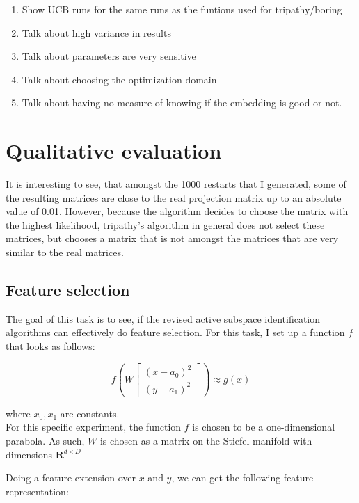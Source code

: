 \begin{enumerate}
\item Show UCB runs for the same runs as the funtions used for tripathy/boring
\item Talk about high variance in results
\item Talk about parameters are very sensitive
\item Talk about choosing the optimization domain
\item Talk about having no measure of knowing if the embedding is good or not.
\end{enumerate}




\section{Qualitative evaluation}
It is interesting to see, that amongst the 1000 restarts that I generated, some of the resulting matrices are close to the real projection matrix up to an absolute value of 0.01.
However, because the algorithm decides to choose the matrix with the highest likelihood, tripathy's algorithm in general does not select these matrices, but chooses a matrix that is not amongst the matrices that are very similar to the real matrices.

\subsection{Feature selection}
The goal of this task is to see, if the revised active subspace identification algorithms can effectively do feature selection.
For this task, I set up a function $ f $ that looks as follows:

\def\B{
\begin{bmatrix}
    (x - a_0)^2 \\
    (y - a_1)^2
\end{bmatrix}}

\begin{equation} \label{eq:FeatureExtension}
f \left( W \B \right) \approx g \left( x \right)
\end{equation} 

where $x_0, x_1$ are constants. \\

For this specific experiment, the function $f$ is chosen to be a one-dimensional parabola. 
As such, $W$ is chosen as a matrix on the Stiefel manifold with dimensions $\mathbf{R}^{d \times D}$

Doing a feature extension over $x$ and $y$, we can get the following feature representation:

